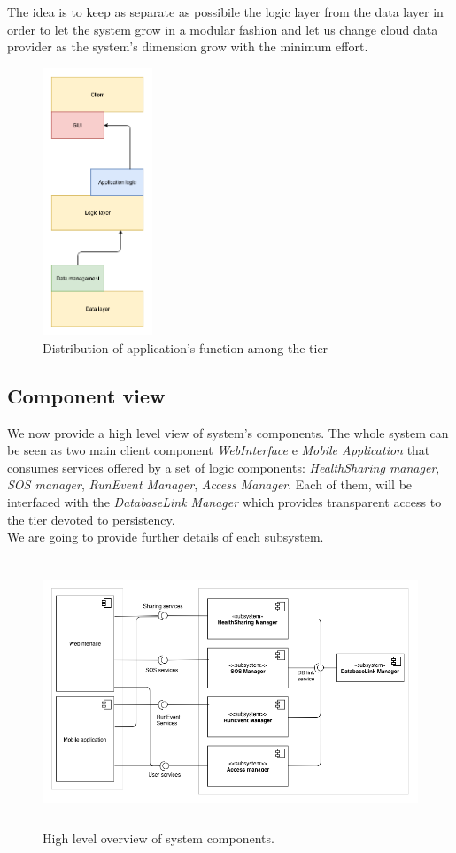 \documentclass[DD.tex]{subfiles}
\begin{document}
The idea is to keep as separate as possibile the logic layer from the data layer in order to let the system grow in a modular fashion and let us change cloud data provider as the system's dimension grow with the minimum effort.

\newpage
\begin{figure}[h!]
	\centering
	\includegraphics[height=8.00cm,keepaspectratio]{Figures/ThreeTierSchema}
	\caption{Distribution of application's function among the tier}
\end{figure}
\newpage

\subsection{Component view}
We now provide a high level view of system's components. The whole system can be seen as two main client component \textit{WebInterface} e \textit{Mobile Application} that consumes services offered by a set of logic components: \textit{HealthSharing manager}, \textit{SOS manager}, \textit{RunEvent Manager}, \textit{Access Manager}. Each of them, will be interfaced with the \textit{DatabaseLink Manager} which provides transparent access to the tier devoted to persistency.
\\ We are going to provide further details of each subsystem.

\begin{figure}[h!]
	\centering
	\includegraphics[height=8.00cm,keepaspectratio]{Figures/ComponentOverview}
	\caption{High level overview of system components.}
\end{figure}
\end{document}
